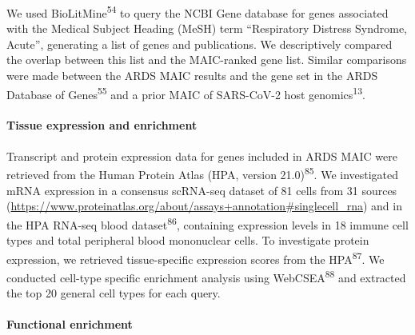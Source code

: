 \documentclass[
  11,
  a4paper,
]{article}
\let\oldparagraph\paragraph
\renewcommand{\paragraph}[1]{\oldparagraph{#1}\mbox{}}
\begin{document}
We used BioLitMine\textsuperscript{54} to query the NCBI Gene database
for genes associated with the Medical Subject Heading (MeSH) term
``Respiratory Distress Syndrome, Acute'', generating a list of genes and
publications. We descriptively compared the overlap between this list
and the MAIC-ranked gene list. Similar comparisons were made between the
ARDS MAIC results and the gene set in the ARDS Database of
Genes\textsuperscript{55} and a prior MAIC of SARS-CoV-2 host
genomics\textsuperscript{13}.

\hypertarget{tissue-expression-and-enrichment}{%
\paragraph{Tissue expression and
enrichment}\label{tissue-expression-and-enrichment}}

Transcript and protein expression data for genes included in ARDS MAIC
were retrieved from the Human Protein Atlas (HPA, version
21.0)\textsuperscript{85}. We investigated mRNA expression in a
consensus scRNA-seq dataset of 81 cells from 31 sources
(\url{https://www.proteinatlas.org/about/assays+annotation\#singlecell_rna})
and in the HPA RNA-seq blood dataset\textsuperscript{86}, containing
expression levels in 18 immune cell types and total peripheral blood
mononuclear cells. To investigate protein expression, we retrieved
tissue-specific expression scores from the HPA\textsuperscript{87}. We
conducted cell-type specific enrichment analysis using
WebCSEA\textsuperscript{88} and extracted the top 20 general cell types
for each query.

\hypertarget{functional-enrichment-1}{%
\paragraph{Functional enrichment}\label{functional-enrichment-1}}
\end{document}
